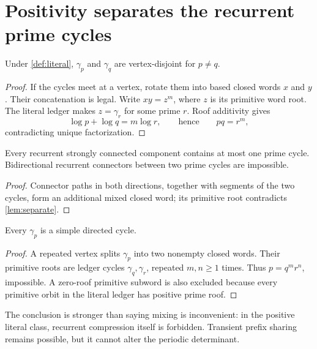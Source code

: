 \section{Positivity separates the recurrent prime cycles}

\begin{lemma}\label{lem:separate}
Under \cref{def:literal}, $\gamma_p$ and $\gamma_q$ are vertex-disjoint for
$p\ne q$.
\end{lemma}

\begin{proof}
If the cycles meet at a vertex, rotate them into based closed words $x$ and
$y$.  Their concatenation is legal.  Write $xy=z^m$, where $z$ is its
primitive word root.  The literal ledger makes $z=\gamma_r$ for some prime
$r$.  Roof additivity gives
\[
  \log p+\log q=m\log r,\qquad\text{hence}\qquad pq=r^m,
\]
contradicting unique factorization.
\end{proof}

\begin{corollary}\label{cor:scc}
Every recurrent strongly connected component contains at most one prime
cycle.  Bidirectional recurrent connectors between two prime cycles are
impossible.
\end{corollary}

\begin{proof}
Connector paths in both directions, together with segments of the two
cycles, form an additional mixed closed word; its primitive root contradicts
\cref{lem:separate}.
\end{proof}

\begin{lemma}[simplicity]\label{lem:simple}
Every $\gamma_p$ is a simple directed cycle.
\end{lemma}

\begin{proof}
A repeated vertex splits $\gamma_p$ into two nonempty closed words.  Their
primitive roots are ledger cycles $\gamma_q,\gamma_r$, repeated $m,n\ge1$
times.  Thus $p=q^mr^n$, impossible.  A zero-roof primitive subword is also
excluded because every primitive orbit in the literal ledger has positive
prime roof.
\end{proof}

The conclusion is stronger than saying mixing is inconvenient: in the
positive literal class, recurrent compression itself is forbidden.
Transient prefix sharing remains possible, but it cannot alter the periodic
determinant.
